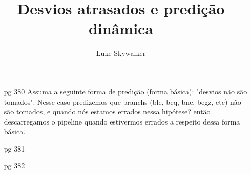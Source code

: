 \documentclass{article}
\author{Luke Skywalker}
\title{Desvios atrasados e predição dinâmica}
\begin{document}
\maketitle

\begin{enumerate}
\item[pg 380] Assuma a seguinte forma de predição (forma básica): "desvios não 
são tomados". Nesse caso predizemos que branchs (ble, beq, bne, begz, etc) não 
são tomados, e quando nós estamos errados nessa hipótese? então descarregamos o 
pipeline quando estivermos errados a respeito dessa forma básica. 
\item[pg 381]
\item[pg 382]
\end{enumerate}
\end{document}
